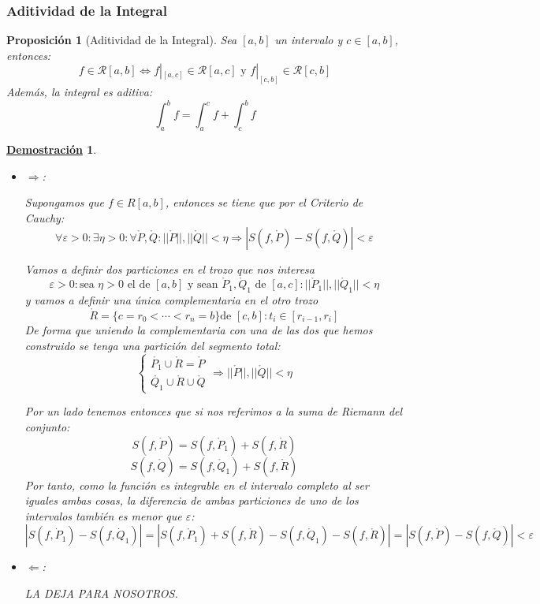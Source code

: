 \documentclass[10pt,a4paper,openright]{book}
\theoremstyle{break}
\newtheorem{prop}{Proposición}[chapter]
\newtheorem*{demo}{\underline{Demostración}}
\begin{document}
\subsubsection{Aditividad de la Integral}
\begin{prop}[Aditividad de la Integral]
Sea $[a,b]$ un intervalo y $c\in [a,b]$, entonces:
$$f \in \mathcal{R}[a,b]\Leftrightarrow f|_{[a,c]} \in \mathcal{R} [a,c] \mbox{ y } f|_{[c,b]} \in \mathcal{R} [c,b]$$
Además, la integral es aditiva:
$$\int_{a}^{b} f = \int_{a}^{c} f + \int_{c}^{b} f$$
\end{prop}
\begin{demo}
\begin{itemize}
\item $\Rightarrow$:

Supongamos que $f\in R[a,b]$, entonces se tiene que por el Criterio de Cauchy:
$$\forall \varepsilon >0:  \exists \eta > 0 : \forall \mathring{P}, \mathring{Q}:  ||\mathring{P} || , ||\mathring{Q} || < \eta \Rightarrow |S(f,\mathring{P}) - S(f,\mathring{Q})| < \varepsilon $$ 

Vamos a definir dos particiones en el trozo que nos interesa
$$\varepsilon > 0: \mbox{sea }\eta > 0\mbox{ el de }[a,b] \mbox{ y sean }\mathring{P}_1, \mathring{Q}_1\mbox{ de }[a,c]: ||\mathring{P}_1 || , ||\mathring{Q}_1 || < \eta$$
y vamos a definir una única complementaria en el otro trozo
$$\mathring{R} = \{c = r_0 < \cdots < r_n = b\}\mbox{de }[c,b]: t_i \in [r_{i-1}, r_i]$$
De forma que uniendo la complementaria con una de las dos que hemos construido se tenga una partición del segmento total:
$$\begin{cases} \mathring{P_1}\cup \mathring{R} = \mathring{P} \\ \mathring{Q_1}\cup \mathring{R} \cup \mathring{Q} \end{cases}\Rightarrow ||\mathring{P}||, ||\mathring{Q}||<\eta$$

Por un lado tenemos entonces que si nos referimos a la suma de Riemann del conjunto:
$$S(f,\mathring{P}) = S(f,\mathring{P}_1) + S(f,\mathring{R})$$
$$S(f,\mathring{Q}) = S(f,\mathring{Q}_1) + S(f,\mathring{R})$$
Por tanto, como la función es integrable en el intervalo completo al ser iguales ambas cosas, la diferencia de ambas particiones de uno de los intervalos también es menor que $\varepsilon$:
$$|S(f,\dot{P}_1) - S(f,\dot{Q}_1)|= |S(f,\mathring{P}_1) + S(f,\mathring{R}) - S(f,\mathring{Q}_1) - S(f,\mathring{R})| = |S(f,\mathring{P}) - S(f,\mathring{Q})| < \varepsilon$$

\item $\Leftarrow$: 

LA DEJA PARA NOSOTROS.
\end{itemize}
\end{demo}
\end{document}

